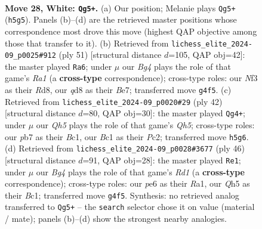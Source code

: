 \documentclass[11pt]{article}
\begin{document}
\begin{figure}[p]
\label{fig:thought-m52}
\end{figure}

\clearpage

\begin{figure}[p]\centering
\begin{subfigure}{0.46\textwidth}\centering
\resizebox{\linewidth}{!}{%
\newchessgame
\chessboard[
  setfen={2bq1bk1/rp1pr2p/p3p3/2P2p1Q/P1nP2BP/2N2N2/1P3PK1/R1B2R2 w - - 0 28},
  showmover=false,
  pgfstyle=straightmove, color=movearrow, markmove={h5-g5}
]}
\caption{}
\end{subfigure}\hfill
\begin{subfigure}{0.46\textwidth}\centering
\resizebox{\linewidth}{!}{%
\newchessgame
\chessboard[
  setfen={rq1r2k1/4bp1p/1Np1b1p1/p3p3/2P2nP1/1P2BP2/P4Q1P/1R2RB1K b - - 4 26},
  showmover=false,
  pgfstyle=straightmove, color=movearrow, markmove={a8-a6}
]}
\caption{}
\end{subfigure}
\\[4pt]
\begin{subfigure}{0.46\textwidth}\centering
\resizebox{\linewidth}{!}{%
\newchessgame
\chessboard[
  setfen={2bq1rk1/r4p2/p2pp3/1ppB3Q/3nP3/2NP4/PPP3PP/R1B3K1 w - - 8 22},
  showmover=false,
  pgfstyle=straightmove, color=movearrow, markmove={h5-g4}
]}
\caption{}
\end{subfigure}\hfill
\begin{subfigure}{0.46\textwidth}\centering
\resizebox{\linewidth}{!}{%
\newchessgame
\chessboard[
  setfen={r1q1k2r/p3bpp1/4p2p/2p2b1P/1PP2Q2/P1n2N2/5PP1/R1BR1BK1 w kq - 7 24},
  showmover=false,
  pgfstyle=straightmove, color=movearrow, markmove={d1-e1}
]}
\caption{}
\end{subfigure}
\caption{\textbf{Move 28, White: \texttt{Qg5+}.} (a) Our position; Melanie plays \texttt{Qg5+} (\texttt{h5g5}). Panels (b)--(d) are the retrieved master positions whose correspondence most drove this move (highest QAP objective among those that transfer to it). (b) Retrieved from \texttt{lichess\_elite\_2024-09\_p0025\#912} (ply 51) [structural distance $d$=105, QAP obj=42]: the master played \texttt{Ra6}; under $\mu$ our \emph{Bg4} plays the role of that game's \emph{Ra1} (a \textbf{cross-type} correspondence); cross-type roles: our \emph{N}f3 as their \emph{R}d8, our \emph{q}d8 as their \emph{B}e7; transferred move \texttt{g4f5}. (c) Retrieved from \texttt{lichess\_elite\_2024-09\_p0020\#29} (ply 42) [structural distance $d$=80, QAP obj=30]: the master played \texttt{Qg4+}; under $\mu$ our \emph{Qh5} plays the role of that game's \emph{Qh5}; cross-type roles: our \emph{p}b7 as their \emph{B}c1, our \emph{B}c1 as their \emph{P}c2; transferred move \texttt{h5g6}. (d) Retrieved from \texttt{lichess\_elite\_2024-09\_p0028\#3677} (ply 46) [structural distance $d$=91, QAP obj=28]: the master played \texttt{Re1}; under $\mu$ our \emph{Bg4} plays the role of that game's \emph{Rd1} (a \textbf{cross-type} correspondence); cross-type roles: our \emph{p}e6 as their \emph{R}a1, our \emph{Q}h5 as their \emph{B}c1; transferred move \texttt{g4f5}. Synthesis: no retrieved analog transferred to \texttt{Qg5+} -- the \texttt{search} selector chose it on value (material / mate); panels (b)--(d) show the strongest nearby analogies.}

\end{figure}
\end{document}

